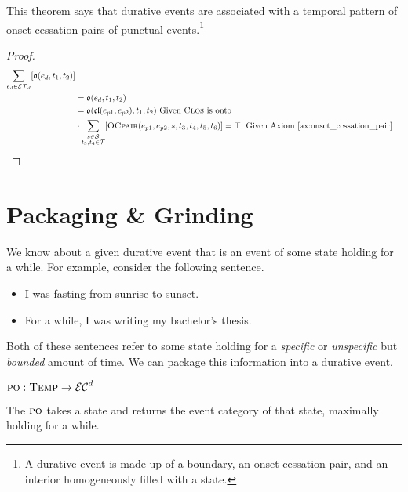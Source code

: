 This theorem says that durative events are associated with a temporal pattern of onset-cessation pairs of punctual events.\footnote{A durative event is
    made up of a boundary, an onset-cessation pair, and an interior homogeneously filled with a state.}

\begin{proof}
    \begin{align*}
        \sum_{e_d \in \mathcal{ET}_d}[\mathfrak{o}(e_d, t_1, t_2)]                                                 \\
         & = \mathfrak{o}(e_d, t_1, t_2)                                                                           \\
         & = \mathfrak{o}(\mathfrak{cl}(e_{p1}, e_{p2}), t_1, t_2) \ \text{Given} \ \textsc{Clos} \ \text{is onto} \\
         & \cdot \sum_{\substack{s \in \mathcal{S}                                                                 \\ t_3, t_4 \in \mathcal{T}}}[\textsc{OCpair}(e_{p1}, e_{p2}, s, t_3, t_4, t_5, t_6)]= \top. \ \text{Given Axiom~\ref{ax:onset_cessation_pair}}
    \end{align*}
\end{proof}

\section{Packaging \& Grinding}
We know about a given durative event that is an event of some state holding for a while. For example, consider the following sentence.

\begin{itemize}
    \item I was fasting from sunrise to sunset.
    \item For a while, I was writing my bachelor's thesis.
\end{itemize}

Both of these sentences refer to some state holding for a \textit{specific} or \textit{unspecific} but \textit{bounded} amount of time. We can package this information into a durative event.

\begin{defn}
    $\textsc{po} : \textsc{Temp} \to \mathcal{EC}^d$
\end{defn}

The $\textsc{po}$ takes a state and returns the event category of that state, maximally holding for a while.

